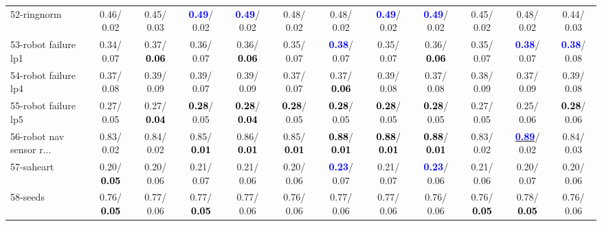 \begin{table}[h]
\begin{center}
{\begin{tabular}{lc|c|c|c|c|c|c|c|c|c|c}
52-ringnorm &   0.46/  0.02 &   0.45/  0.03 & \textcolor{blue}{\textbf{  0.49}}/  0.02 & \textcolor{blue}{\textbf{  0.49}}/  0.02 &   0.48/  0.02 &   0.48/  0.02 & \textcolor{blue}{\textbf{  0.49}}/  0.02 & \textcolor{blue}{\textbf{  0.49}}/  0.02 &   0.45/  0.02 &   0.48/  0.02 &   0.44/  0.03 \\
53-robot failure lp1 &   0.34/  0.07 &   0.37/\textcolor{black}{\textbf{  0.06}} &   0.36/  0.07 &   0.36/\textcolor{black}{\textbf{  0.06}} &   0.35/  0.07 & \textcolor{blue}{\textbf{  0.38}}/  0.07 &   0.35/  0.07 &   0.36/\textcolor{black}{\textbf{  0.06}} &   0.35/  0.07 & \textcolor{blue}{\textbf{  0.38}}/  0.07 & \textcolor{blue}{\textbf{  0.38}}/  0.08 \\ \hline
54-robot failure lp4 &   0.37/  0.08 &   0.39/  0.09 &   0.39/  0.07 &   0.39/  0.09 &   0.37/  0.07 &   0.37/\textcolor{black}{\textbf{  0.06}} &   0.39/  0.08 &   0.37/  0.08 &   0.38/  0.09 &   0.37/  0.09 &   0.39/  0.08 \\
55-robot failure lp5 &   0.27/  0.05 &   0.27/\textcolor{black}{\textbf{  0.04}} & \textcolor{black}{\textbf{  0.28}}/  0.05 & \textcolor{black}{\textbf{  0.28}}/\textcolor{black}{\textbf{  0.04}} & \textcolor{black}{\textbf{  0.28}}/  0.05 & \textcolor{black}{\textbf{  0.28}}/  0.05 & \textcolor{black}{\textbf{  0.28}}/  0.05 & \textcolor{black}{\textbf{  0.28}}/  0.05 &   0.27/  0.05 &   0.25/  0.06 & \textcolor{black}{\textbf{  0.28}}/  0.06 \\
56-robot nav sensor r... &   0.83/  0.02 &   0.84/  0.02 &   0.85/\textcolor{black}{\textbf{  0.01}} &   0.86/\textcolor{black}{\textbf{  0.01}} &   0.85/\textcolor{black}{\textbf{  0.01}} & \textcolor{black}{\textbf{  0.88}}/\textcolor{black}{\textbf{  0.01}} & \textcolor{black}{\textbf{  0.88}}/\textcolor{black}{\textbf{  0.01}} & \textcolor{black}{\textbf{  0.88}}/\textcolor{black}{\textbf{  0.01}} &   0.83/  0.02 & \underline{\textcolor{blue}{\textbf{  0.89}}}/  0.02 &   0.84/  0.03 \\
57-saheart &   0.20/\textcolor{black}{\textbf{  0.05}} &   0.20/  0.06 &   0.21/  0.07 &   0.21/  0.06 &   0.20/  0.06 & \textcolor{blue}{\textbf{  0.23}}/  0.07 &   0.21/  0.07 & \textcolor{blue}{\textbf{  0.23}}/  0.06 &   0.21/  0.06 &   0.20/  0.07 &   0.20/  0.06 \\
58-seeds &   0.76/\textcolor{black}{\textbf{  0.05}} &   0.77/  0.06 &   0.77/\textcolor{black}{\textbf{  0.05}} &   0.77/  0.06 &   0.76/  0.06 &   0.77/  0.06 &   0.77/  0.06 &   0.76/  0.06 &   0.76/\textcolor{black}{\textbf{  0.05}} &   0.78/\textcolor{black}{\textbf{  0.05}} &   0.76/  0.06 \\

\end{tabular}}
\end{center}
\end{table}
